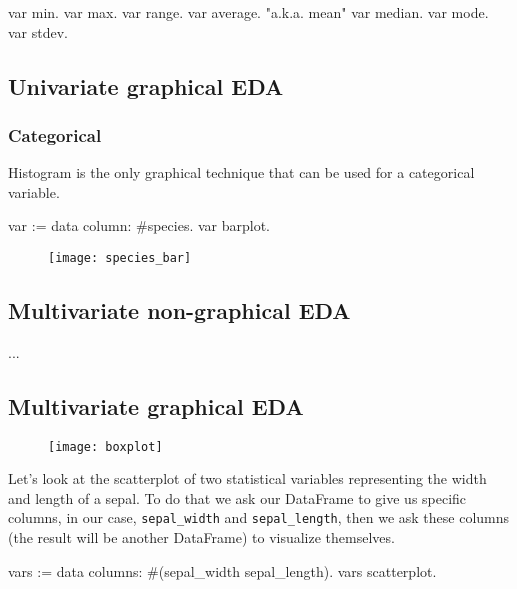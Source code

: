 \documentclass{article}
\begin{document}
\begin{code}{}
var min.
var max.
var range.
var average. "a.k.a. mean"
var median.
var mode.
var stdev.
\end{code}

\subsection{Univariate graphical EDA}
\subsubsection{Categorical}

Histogram is the only graphical technique that can be used for a categorical variable.

\begin{code}{}
var := data column: #species.
var barplot.
\end{code}

\begin{figure}[H]
  \begin{center}
  \texttt{[image: species\_bar]}
  \end{center}
\end{figure}

\subsection{Multivariate non-graphical EDA}
...

\subsection{Multivariate graphical EDA}
\begin{figure}[H]
  \begin{center}
  \texttt{[image: boxplot]}
  \end{center}
\end{figure}

Let's look at the scatterplot of two statistical variables representing the width and length of a sepal. To do that we ask our DataFrame to give us specific columns, in our case, \texttt{sepal\_width} and \texttt{sepal\_length}, then we ask these columns (the result will be another DataFrame) to visualize themselves.

\begin{code}{}
vars := data columns: #(sepal_width sepal_length).
vars scatterplot.
\end{code}
\end{document}
